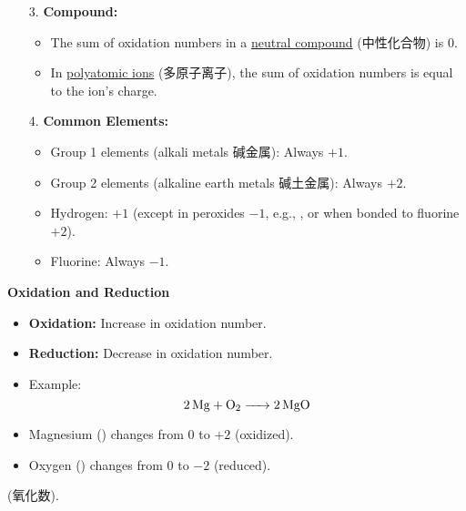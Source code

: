 \begin{itemize}
{\begin{itemize}
        $=-1$).
        \item[3.] \textbf{Compound:}
        \begin{itemize}
            \item The sum of oxidation numbers in a \underline{neutral compound} (中性化合物) is 0.
            \item In \underline{polyatomic ions} (多原子离子), the sum of oxidation numbers is equal to the ion's charge.
        \end{itemize}
        \item[4.] \textbf{Common Elements:}
        \begin{itemize}
            \item Group 1 elements (alkali metals 碱金属): Always $+1$.
            \item Group 2 elements (alkaline earth metals 碱土金属): Always $+2$.
            \item Hydrogen: $+1$ (except in peroxides $-1$, e.g., , or when bonded to fluorine $+2$).
            \item Fluorine: Always $-1$.
        \end{itemize}
    \end{itemize}\par
    \textbf{Oxidation and Reduction}
    \begin{itemize}
        \item \textbf{Oxidation:} Increase in oxidation number.
        \item \textbf{Reduction:} Decrease in oxidation number.
        \item Example:
        \begin{equation}
            \ce{2Mg + O2 -> 2MgO}
        \end{equation}
        \item Magnesium () changes from $0$ to $+2$ (oxidized).
        \item Oxygen () changes from $0$ to $-2$ (reduced).
    \end{itemize}} (氧化数).
\end{itemize}

